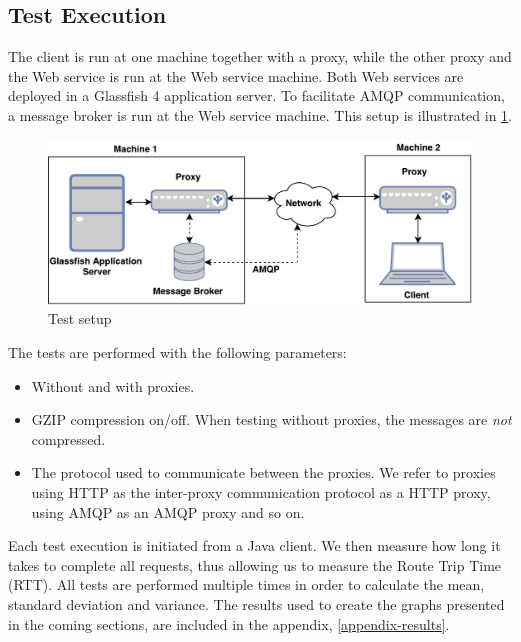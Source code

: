 \subsection{Test Execution}

The client is run at one machine together with a proxy, while the other proxy
and the Web service is run at the Web service machine. Both Web services are deployed
in a Glassfish 4 application server. To facilitate AMQP communication, a message
broker is run at the Web service machine. This setup is illustrated in
\cref{figure-testing-setup}.

\begin{figure}[h]
\includegraphics[width=\textwidth]{images/testing_setup.pdf}
\caption{Test setup}
\label{figure-testing-setup}
\end{figure}

The tests are performed with the following parameters:

\begin{itemize}

    \item Without and with proxies.

    \item GZIP compression on/off. When testing without proxies, the messages
    are \textit{not} compressed.

    \item The protocol used to communicate between the proxies. We refer to
    proxies using HTTP as the inter-proxy communication protocol as a HTTP
    proxy, using AMQP as an AMQP proxy and so on.

\end{itemize}

Each test execution is initiated from a Java client. We then measure how long it
takes to complete all requests, thus allowing us to measure the Route Trip Time
(RTT). All tests are performed multiple times in order to calculate the mean,
standard deviation and variance. The results used to create the graphs presented
in the coming sections, are included in the appendix, \cref{appendix-results}.


